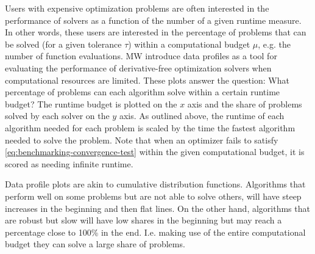 \noindent Users with expensive optimization problems are often interested in the performance of solvers as a function of the number of a given runtime measure. In other words, these users are interested in the percentage of problems that can be solved (for a given tolerance $\tau$) within a computational budget $\mu$, e.g. the number of function evaluations.
MW introduce data profiles as a tool for evaluating the performance of derivative-free optimization solvers when computational resources are limited.
These plots answer the question: What percentage of problems can each algorithm
solve within a certain runtime budget? The runtime budget is plotted on the $x$ axis and the share of problems solved by each solver on the $y$ axis.
As outlined above, the runtime of each algorithm needed for each problem is scaled by the time the fastest algorithm needed to solve the problem.
Note that when an optimizer fails to satisfy \ref{eq:benchmarking-convergence-test} within the given computational budget, it is scored as needing infinite runtime.

\noindent Data profile plots are akin to cumulative distribution functions. Algorithms that perform well on some
problems but are not able to solve others, will have steep increases in the beginning and then flat lines.
On the other hand, algorithms that are robust but slow will have low shares in the beginning but may reach a percentage close to 100\% in the end. I.e. making use of the entire computational budget they can solve a large share of problems.






